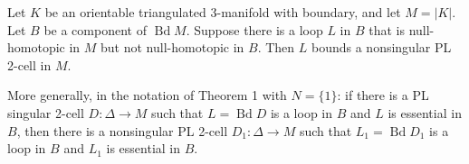 Let $K$ be an orientable triangulated 3-manifold with boundary, and let $M = |K|$. Let $B$ be a component of $\operatorname{Bd} M$. Suppose there is a loop $L$ in $B$ that is null-homotopic in $M$ but not null-homotopic in $B$. Then $L$ bounds a nonsingular PL 2-cell in $M$.

More generally, in the notation of Theorem 1 with $N = \{1\}$: if there is a PL singular 2-cell $D: \Delta \rightarrow M$ such that $L = \operatorname{Bd} D$ is a loop in $B$ and $L$ is essential in $B$, then there is a nonsingular PL 2-cell $D_1: \Delta \rightarrow M$ such that $L_1 = \operatorname{Bd} D_1$ is a loop in $B$ and $L_1$ is essential in $B$.
